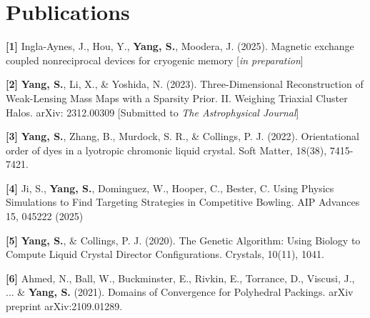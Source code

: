 \documentclass[letterpaper,11pt]{article}
\newcommand{\resumeSubHeadingListStart}{\begin{itemize}[leftmargin=0.15in, label={}]}
\newcommand{\resumeSubHeadingListEnd}{\end{itemize}}
\begin{document}
\section{Publications}
  \vspace{3pt}
  \resumeSubHeadingListStart
    \small{\item{
        \textbf{[1]}{ Ingla-Aynes, J., Hou, Y., \textbf{Yang, S.}, Moodera, J. (2025). Magnetic exchange coupled nonreciprocal devices for cryogenic memory [\textit{in preparation}]}
    
        \textbf{[2]}{ \textbf{Yang, S.}, Li, X., \& Yoshida, N. (2023). Three-Dimensional Reconstruction of Weak-Lensing Mass Maps with a Sparsity Prior. II. Weighing Triaxial Cluster Halos. arXiv: 2312.00309 [Submitted to \textit{The Astrophysical Journal}]}

    
        \textbf{[3]}{ \textbf{Yang, S.}, Zhang, B., Murdock, S. R., \& Collings, P. J. (2022). Orientational order of dyes in a lyotropic chromonic liquid crystal. Soft Matter, 18(38), 7415-7421. } \\ \vspace{3pt}

        \textbf{[4]}{ Ji, S., \textbf{Yang, S.}, Dominguez, W., Hooper, C., Bester, C. Using Physics Simulations to Find Targeting Strategies in Competitive Bowling. AIP Advances 15, 045222 (2025)}
        
        \textbf{[5]}{ \textbf{Yang, S.}, \& Collings, P. J. (2020). The Genetic Algorithm: Using Biology to Compute Liquid Crystal Director Configurations. Crystals, 10(11), 1041. } \\ \vspace{3pt}
    
        \textbf{[6]}{ Ahmed, N., Ball, W., Buckminster, E., Rivkin, E., Torrance, D., Viscusi, J., ... \& \textbf{Yang, S.} (2021). Domains of Convergence for Polyhedral Packings. arXiv preprint arXiv:2109.01289.} \\ \vspace{3pt}
        
        
        
        
    }}
  \resumeSubHeadingListEnd
  
\end{document}
